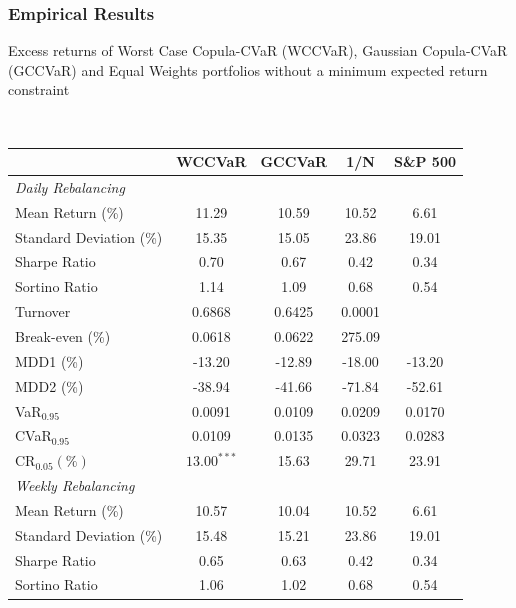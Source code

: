 \documentclass[pdf,10pt,xcolor=dvipsnames,hide notes]{beamer}
\begin{document}
\begin{frame}
	\frametitle{Empirical Results}
	
	
	\begin{threeparttable}[H]
		\caption{\footnotesize Excess returns of Worst Case Copula-CVaR (WCCVaR), Gaussian Copula-CVaR (GCCVaR) and Equal Weights portfolios without a minimum expected return constraint}
		\label{tab:tabletwo}\centering
		\tiny \
		\begin{tabularx}{\textwidth}{@{\extracolsep{\fill}}lcccc@{}}
			\toprule & \textbf{WCCVaR} & \textbf{GCCVaR} & \textbf{1/N} & \textbf{S\&P 500%
			} \\
			\midrule[\heavyrulewidth] \textit{Daily Rebalancing} &  &  &  &  \\
			\midrule[\heavyrulewidth] Mean Return (\%) & \cellcolor{corn} 11.29 & 10.59 & 10.52 & 6.61
			\\
			Standard Deviation (\%) & 15.35 & \cellcolor{celadon} 15.05 & 23.86 & 19.01 \\
			Sharpe Ratio & \cellcolor{corn} 0.70 & 0.67 & 0.42 & 0.34 \\
			Sortino Ratio & 1.14 & 1.09 & 0.68 & 0.54 \\
			Turnover & 0.6868 & 0.6425 & 0.0001 &  \\
			Break-even (\%) & 0.0618 & 0.0622 & 275.09 &  \\
			MDD1 (\%) & -13.20 & \cellcolor{celadon} -12.89 & -18.00 & -13.20 \\
			MDD2 (\%) & \cellcolor{corn} -38.94 & -41.66 & -71.84 & -52.61 \\
			VaR$_{0.95}$ & \cellcolor{corn} 0.0091 & 0.0109 & 0.0209  & 0.0170 \\
			CVaR$_{0.95}$ & \cellcolor{corn} 0.0109 & 0.0135 & 0.0323 & 0.0283  \\
			CR$_{0.05} (\%)$ & \cellcolor{corn} $13.00^{***}$ & 15.63 & 29.71 & 23.91  \\
			\midrule[\heavyrulewidth] \textit{Weekly Rebalancing} &  &  &  &  \\
			\midrule[\heavyrulewidth] Mean Return (\%) & 10.57 & 10.04 & 10.52 & 6.61
			\\
			Standard Deviation (\%) & 15.48 & 15.21 & 23.86 & 19.01 \\
			Sharpe Ratio & 0.65 & 0.63 & 0.42 & 0.34 \\
			Sortino Ratio & 1.06 & 1.02 & 0.68 & 0.54 \\

\end{tabularx}
\end{threeparttable}
\end{frame}
\end{document}
